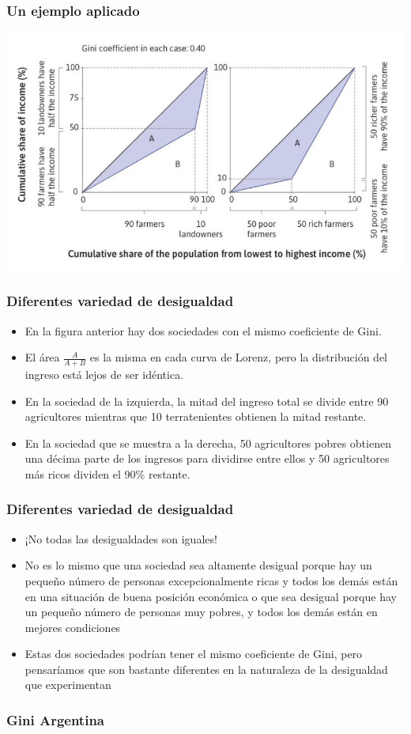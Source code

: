 \documentclass{beamer}
\begin{document}
\begin{frame} 
\frametitle{Un ejemplo aplicado}
    \begin{center}    
    \includegraphics[scale=0.55]{../Tema_04.20_variedaddesigual.jpg}
    \end{center}
\end{frame}

\begin{frame} 
\frametitle{Diferentes variedad de desigualdad}
\begin{itemize}
\item En la figura anterior hay dos sociedades con el mismo coeficiente de Gini.
\item El área $\frac{A}{A + B}$ es la misma en cada curva de Lorenz, pero la distribución del ingreso está lejos de ser idéntica.
\item En la sociedad de la izquierda, la mitad del ingreso total se divide entre 90 agricultores mientras que 10 terratenientes obtienen la mitad restante. 
\item En la sociedad que se muestra a la derecha, 50 agricultores pobres obtienen una décima parte de los ingresos para dividirse entre ellos y 50 agricultores más ricos dividen el 90\% restante.
\end{itemize}
\end{frame}

\begin{frame} 
\frametitle{Diferentes variedad de desigualdad}
\begin{itemize}
\item ¡No todas las desigualdades son iguales!
\item No es lo mismo que una sociedad sea altamente desigual porque hay un pequeño número de personas excepcionalmente ricas y todos los demás están en una situación de buena posición económica o que sea desigual porque hay un pequeño número de personas muy pobres, y todos los demás están en mejores condiciones
\item Estas dos sociedades podrían tener el mismo coeficiente de Gini, pero pensaríamos que son bastante diferentes en la naturaleza de la desigualdad que experimentan
\end{itemize}
\end{frame}

\begin{frame} 
\frametitle{Gini Argentina}

\end{frame}
\end{document}
